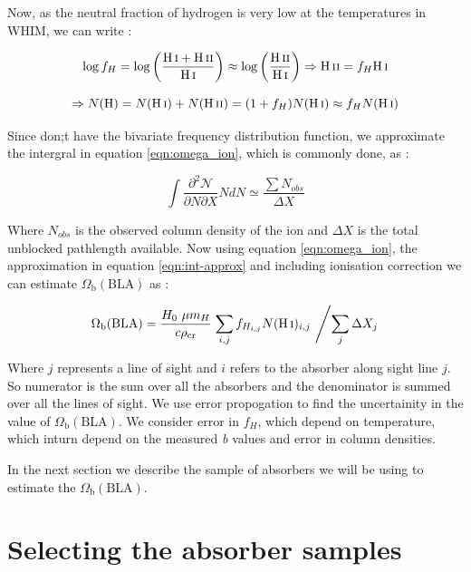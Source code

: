 Now, as the neutral fraction of hydrogen is very low at the temperatures in WHIM, we can write :

\begin{equation*}
     \log f_H = \log \left(\frac{\ion{H}{i}+\ion{H}{ii}}{\ion{H}{i}}\right) \approx \log \left(\frac{\ion{H}{ii}}{\ion{H}{i}}\right)  \Rightarrow  \ion{H}{ii}= f_H \ion{H}{i}
\end{equation*}

\begin{equation*}
     \Rightarrow  N(\text{H}) = N(\ion{H}{i})+N(\ion{H}{ii}) = (1+f_H)N(\ion{H}{i}) \approx f_H N(\ion{H}{i})
\end{equation*}

Since don;t have the bivariate frequency distribution function, we approximate the intergral in equation \ref{eqn:omega_ion}, which is commonly done, as : 

\begin{equation} \label{eqn:int-approx}
    \int \frac{\partial ^2 \mathcal{N}}{\partial N  \partial X} N dN \simeq \frac{\sum N_{obs}}{\Delta X} 
\end{equation}

Where $N_{obs}$ is the observed column density of the ion and $\Delta X$ is the total unblocked pathlength available. Now using equation \ref{eqn:omega_ion}, the approximation in equation \ref{eqn:int-approx} and including ionisation correction we can estimate $\Omega_\text{b}(\text{BLA})$ as :

\begin{equation}
    \Omega_\text{b}(\text{BLA}) = \frac{H_0 \ \mu m_H}{c \rho_{\text{cr}}} \left. \sum_{i,j} f_{H_{i,j}} N(\ion{H}{i})_{i,j} \ \middle / \sum_j \Delta X_j \right.
\end{equation}

Where $j$ represents a line of sight and $i$ refers to the absorber along sight line $j$. So numerator is the sum over all the absorbers and the denominator is summed over all the lines of sight.  We use error propogation to find the uncertainity in the value of $\Omega_\text{b}(\text{BLA})$. We consider error in $f_H$, which depend on temperature, which inturn depend on the measured \emph{b} values and error in  column densities.  

In the next section we describe the sample of absorbers we will be using to estimate the $\Omega_\text{b}(\text{BLA})$.

\section{Selecting the absorber samples}  \label{sec:BLA-sample}


